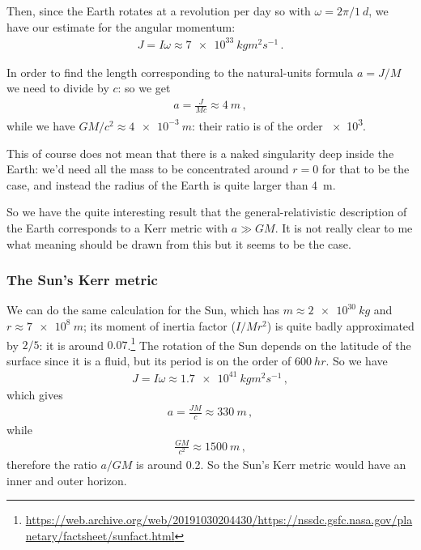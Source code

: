 \documentclass[main.tex]{subfiles}
\begin{document}
Then, since the Earth rotates at a revolution per day so with \(\omega = 2\pi / \SI{1}{d}\), we have our estimate for the angular momentum: 
%
\begin{align}
  J = I \omega 
  \approx \SI{7e+33}{kg m^2 s^{-1}}
\,.
\end{align}

In order to find the length corresponding to the natural-units formula \(a = J/M\) we need to divide by \(c\): so we get 
%
\begin{align}
  a = \frac{J}{Mc} \approx \SI{4}{m}
\,,
\end{align}
%
while we have \(GM/c^2 \approx \SI{4e-3}{m}\): their ratio is of the order \num{e3}.

This of course does not mean that there is a naked singularity deep inside the Earth: we'd need all the mass to be concentrated around \(r=0\) for that to be the case, and instead the radius of the Earth is quite larger than \SI{4}{m}.

So we have the quite interesting result that the general-relativistic description of the Earth corresponds to a Kerr metric with \(a \gg GM\). It is not really clear to me what meaning should be drawn from this but it seems to be the case. 

\subsubsection{The Sun's Kerr metric}

We can do the same calculation for the Sun, which has \(m \approx \SI{2e30}{kg}\) and \(r \approx \SI{7e8}{m}\); its moment of inertia factor (\(I  / Mr^2\)) is quite badly approximated by \(2/5\): it is around \(0.07\).\footnote{\url{https://web.archive.org/web/20191030204430/https://nssdc.gsfc.nasa.gov/planetary/factsheet/sunfact.html}}
The rotation of the Sun depends on the latitude of the surface since it is a fluid, but its period is on the order of \(\SI{600}{hr}\). 
So we have 
%
\begin{align}
  J = I \omega \approx \SI{1.7e41}{kg m^2 s^{-1}}
\,,
\end{align}
%
which gives 
%
\begin{align}
  a = \frac{JM}{c} \approx \SI{330}{m}
\,,
\end{align}
%
while 
%
\begin{align}
  \frac{GM}{c^2} \approx \SI{1500}{m}
\,,
\end{align}
%
therefore the ratio \(a/GM\) is around \num{0.2}. 
So the Sun's Kerr metric would have an inner and outer horizon. 
\end{document}
